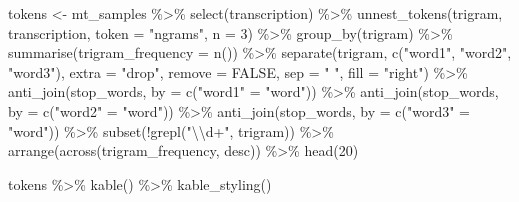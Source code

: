 \documentclass[
]{article}
\newenvironment{Shaded}{\begin{snugshade}}{\end{snugshade}}
\newcommand{\AttributeTok}[1]{\textcolor[rgb]{0.77,0.63,0.00}{#1}}
\newcommand{\ConstantTok}[1]{\textcolor[rgb]{0.00,0.00,0.00}{#1}}
\newcommand{\DecValTok}[1]{\textcolor[rgb]{0.00,0.00,0.81}{#1}}
\newcommand{\FunctionTok}[1]{\textcolor[rgb]{0.00,0.00,0.00}{#1}}
\newcommand{\NormalTok}[1]{#1}
\newcommand{\OtherTok}[1]{\textcolor[rgb]{0.56,0.35,0.01}{#1}}
\newcommand{\SpecialCharTok}[1]{\textcolor[rgb]{0.00,0.00,0.00}{#1}}
\newcommand{\StringTok}[1]{\textcolor[rgb]{0.31,0.60,0.02}{#1}}
\begin{document}
\begin{Shaded}
\begin{Highlighting}[]
\NormalTok{tokens }\OtherTok{\textless{}{-}}\NormalTok{ mt\_samples }\SpecialCharTok{\%\textgreater{}\%}
  \FunctionTok{select}\NormalTok{(transcription) }\SpecialCharTok{\%\textgreater{}\%}
  \FunctionTok{unnest\_tokens}\NormalTok{(trigram, transcription, }\AttributeTok{token =} \StringTok{"ngrams"}\NormalTok{, }\AttributeTok{n =} \DecValTok{3}\NormalTok{) }\SpecialCharTok{\%\textgreater{}\%}
  \FunctionTok{group\_by}\NormalTok{(trigram) }\SpecialCharTok{\%\textgreater{}\%}
  \FunctionTok{summarise}\NormalTok{(}\AttributeTok{trigram\_frequency =} \FunctionTok{n}\NormalTok{()) }\SpecialCharTok{\%\textgreater{}\%}
  \FunctionTok{separate}\NormalTok{(trigram, }
           \FunctionTok{c}\NormalTok{(}\StringTok{"word1"}\NormalTok{, }\StringTok{"word2"}\NormalTok{, }\StringTok{"word3"}\NormalTok{), }
           \AttributeTok{extra =} \StringTok{"drop"}\NormalTok{, }
           \AttributeTok{remove =} \ConstantTok{FALSE}\NormalTok{, }
           \AttributeTok{sep =} \StringTok{" "}\NormalTok{, }
           \AttributeTok{fill =} \StringTok{"right"}\NormalTok{) }\SpecialCharTok{\%\textgreater{}\%}
  \FunctionTok{anti\_join}\NormalTok{(stop\_words, }\AttributeTok{by =} \FunctionTok{c}\NormalTok{(}\StringTok{"word1"} \OtherTok{=} \StringTok{"word"}\NormalTok{)) }\SpecialCharTok{\%\textgreater{}\%}
  \FunctionTok{anti\_join}\NormalTok{(stop\_words, }\AttributeTok{by =} \FunctionTok{c}\NormalTok{(}\StringTok{"word2"} \OtherTok{=} \StringTok{"word"}\NormalTok{)) }\SpecialCharTok{\%\textgreater{}\%}
  \FunctionTok{anti\_join}\NormalTok{(stop\_words, }\AttributeTok{by =} \FunctionTok{c}\NormalTok{(}\StringTok{"word3"} \OtherTok{=} \StringTok{"word"}\NormalTok{)) }\SpecialCharTok{\%\textgreater{}\%}
  \FunctionTok{subset}\NormalTok{(}\SpecialCharTok{!}\FunctionTok{grepl}\NormalTok{(}\StringTok{"}\SpecialCharTok{\textbackslash{}\textbackslash{}}\StringTok{d+"}\NormalTok{, trigram)) }\SpecialCharTok{\%\textgreater{}\%}
  \FunctionTok{arrange}\NormalTok{(}\FunctionTok{across}\NormalTok{(trigram\_frequency, desc)) }\SpecialCharTok{\%\textgreater{}\%}
  \FunctionTok{head}\NormalTok{(}\DecValTok{20}\NormalTok{)}

\NormalTok{tokens }\SpecialCharTok{\%\textgreater{}\%}
  \FunctionTok{kable}\NormalTok{() }\SpecialCharTok{\%\textgreater{}\%}
  \FunctionTok{kable\_styling}\NormalTok{()}
\end{Highlighting}
\end{Shaded}
\end{document}
